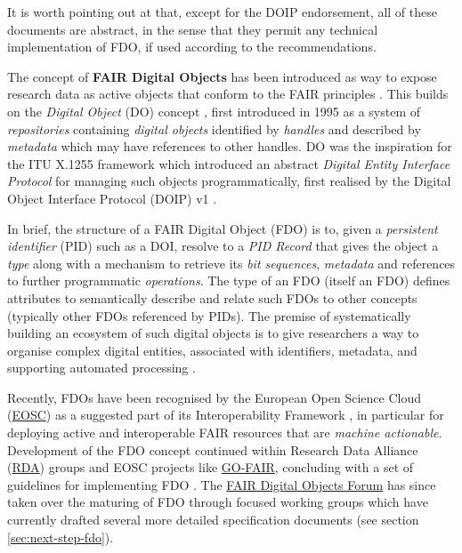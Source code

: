 \documentclass[fleqn,10pt,lineno]{wlpeerj}
\begin{document}
It is worth pointing out at that, except for the DOIP endorsement, all of these documents are abstract, in the sense that they permit any technical implementation of FDO, if used according to the recommendations.

The concept of \textbf{FAIR Digital Objects} \cite{IHLT6hye} has been introduced as way to expose research data as active objects that conform to the FAIR principles \cite{6DjakjNS}. This builds on the \emph{Digital Object} (DO) concept \cite{11MnuwJ4l}, first introduced in 1995 \cite{3Uqe3fuK} as a system of \emph{repositories} containing \emph{digital objects} identified by \emph{handles} and described by \emph{metadata} which may have references to other handles. DO was the inspiration for the ITU X.1255 framework \cite{103Hw8H43} which introduced an abstract \emph{Digital Entity Interface Protocol} for managing such objects programmatically, first realised by the Digital Object Interface Protocol (DOIP) v1 \cite{16uB3jxpa}.

In brief, the structure of a FAIR Digital Object (FDO) is to, given a \emph{persistent identifier} (PID) such as a DOI, resolve to a \emph{PID Record} that gives the object a \emph{type} along with a mechanism to retrieve its \emph{bit sequences}, \emph{metadata} and references to further programmatic \emph{operations}. The type of an FDO (itself an FDO) defines attributes to semantically describe and relate such FDOs to other concepts (typically other FDOs referenced by PIDs). The premise of systematically building an ecosystem of such digital objects is to give researchers a way to organise complex digital entities, associated with identifiers, metadata, and supporting automated processing \cite{tz0P3DTC}.

Recently, FDOs have been recognised by the European Open Science Cloud (\href{https://eosc.eu/}{EOSC}) as a suggested part of its Interoperability Framework \cite{aCye3KpE}, in particular for deploying active and interoperable FAIR resources that are \emph{machine actionable}. Development of the FDO concept continued within Research Data Alliance (\href{https://www.rd-alliance.org/}{RDA}) groups and EOSC projects like \href{https://www.go-fair.org/}{GO-FAIR}, concluding with a set of guidelines for implementing FDO \cite{RwvirqWg}. The \href{https://fairdo.org/}{FAIR Digital Objects Forum} has since taken over the maturing of FDO through focused working groups which have currently drafted several more detailed specification documents (see section \ref{sec:next-step-fdo}).
\end{document}
